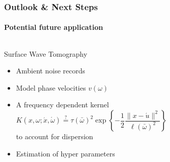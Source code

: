\documentclass[aspectratio=169, t, 10pt]{beamer}
\begin{document}
\begin{frame}[c]
    \frametitle{Outlook \& Next Steps }
    \framesubtitle{Potential future application}

\begin{columns}
%


    \begin{block}{Surface Wave Tomography}
        \begin{itemize}
            \item Ambient noise records
            \item Model phase velocities $v(\omega)$
            \item A frequency dependent kernel
                \begin{equation}
                    K(x,\omega; \acute x, \acute\omega) \overset{?}{=}
                    \tau(\bar \omega)^2 \exp\left\{ -\frac12 \frac{\|x - \acute u\|^2}{\ell(\bar \omega)^2}\right\}
                \end{equation}
                to account for dispersion
            \item Estimation of hyper parameters
        \end{itemize}
    \end{block}


\end{columns}
\end{frame}
\end{document}
